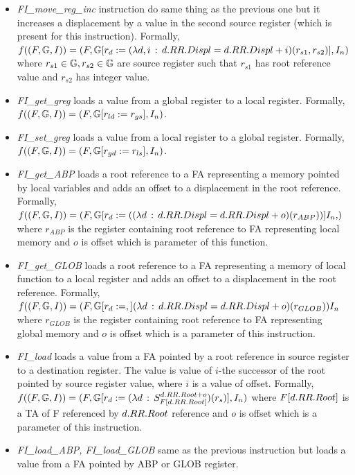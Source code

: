 \begin{itemize}
	\item \emph{FI\_move\_reg\_inc} instruction do same thing as the previous one but
		it increases a displacement by a value in the second source register (which is
		present for this instruction).
		Formally, $f((F, \mathbb{G}, I)) = (F, \mathbb{G} [r_d := (\lambda d,i \,:\, d.RR.Displ = d.RR.Displ + i)(r_{s1}, r_{s2})], I_n)$
		where $r_{s1} \in \mathbb{G}, r_{s2} \in \mathbb{G}$ are source register such that
		$r_{s1}$ has root reference value and $r_{s2}$ has integer value.
	\item \emph{FI\_get\_greg} loads a value from a global register to
		a local register.
		Formally, $f((F, \mathbb{G}, I)) = (F, \mathbb{G} [r_{ld} := r_{gs}], I_n)$.
	\item \emph{FI\_set\_greg} loads a value from a local register to
		a global register.
		Formally, $f((F, \mathbb{G}, I)) = (F, \mathbb{G} [r_{gd} := r_{ls}], I_n)$.
	\item \emph{FI\_get\_ABP} loads a root reference to a FA representing
		a memory pointed by local variables and adds an offset to a displacement
		in the root reference.
		Formally, $f(\stdsym) = \symstate{F}{\regssub{r_{d}}{
				(\lfuncp{d}{d.RR.Displ = d.RR.Displ + o}{r_{ABP}})}
			{I_n}}$ where $r_{ABP}$ is the register containing root
			reference to FA representing local memory and $o$ is offset
			which is parameter of this function.
	\item \emph{FI\_get\_GLOB} loads a root reference to a FA representing
		a memory of local function to a local register
		and adds an offset to a displacement in the root reference.
		Formally, $f((F, \mathbb{G}, I)) = (F, \mathbb{G} [r_{d} := ,] 
				(\lambda d \,:\, d.RR.Displ = d.RR.Displ + o)(r_{GLOB}
			))
			{I_n}$ where $r_{GLOB}$ is the register containing root
			reference to FA representing global memory and $o$ is offset
			which is a parameter of this instruction.
	\item \emph{FI\_load} loads a value from a FA pointed
		by a root reference in source register to a destination register.
		The value is value of $i$-the successor of the root pointed
		by source register value, where $i$ is a value of offset.
		Formally, $f((F, \mathbb{G}, I)) = (F, \mathbb{G} [r_{d} := 
				(\lambda d \,:\, S_{F[d.RR.Root]}^{d.RR.Root + o})(r_{s})
			], I_n)$
			where $F[d.RR.Root]$ is a TA of F referenced by
			$d.RR.Root$ reference and $o$ is offset	which is a parameter of this instruction.
	\item \emph{FI\_load\_ABP, FI\_load\_GLOB} same as the previous instruction
		but loads a value from a FA pointed by ABP or GLOB register.

\end{itemize}
